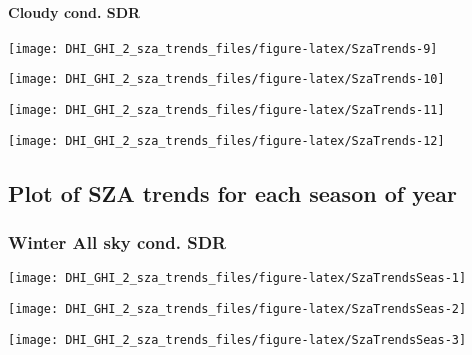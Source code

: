 \documentclass[
  10pt,
  a4paper,oneside]{article}
\begin{document}
\hypertarget{cloudy-cond.-sdr}{%
\paragraph{Cloudy cond. SDR}\label{cloudy-cond.-sdr}}

\begin{center}\texttt{[image: DHI\_GHI\_2\_sza\_trends\_files/figure-latex/SzaTrends-9]} \end{center}

\begin{center}\texttt{[image: DHI\_GHI\_2\_sza\_trends\_files/figure-latex/SzaTrends-10]} \end{center}

\begin{center}\texttt{[image: DHI\_GHI\_2\_sza\_trends\_files/figure-latex/SzaTrends-11]} \end{center}

\begin{center}\texttt{[image: DHI\_GHI\_2\_sza\_trends\_files/figure-latex/SzaTrends-12]} \end{center}

\hypertarget{plot-of-sza-trends-for-each-season-of-year}{%
\subsection{Plot of SZA trends for each season of year}\label{plot-of-sza-trends-for-each-season-of-year}}

\newpage

\hypertarget{winter-all-sky-cond.-sdr}{%
\subsubsection{Winter All sky cond. SDR}\label{winter-all-sky-cond.-sdr}}

\begin{center}\texttt{[image: DHI\_GHI\_2\_sza\_trends\_files/figure-latex/SzaTrendsSeas-1]} \end{center}

\begin{center}\texttt{[image: DHI\_GHI\_2\_sza\_trends\_files/figure-latex/SzaTrendsSeas-2]} \end{center}

\begin{center}\texttt{[image: DHI\_GHI\_2\_sza\_trends\_files/figure-latex/SzaTrendsSeas-3]} \end{center}
\end{document}
